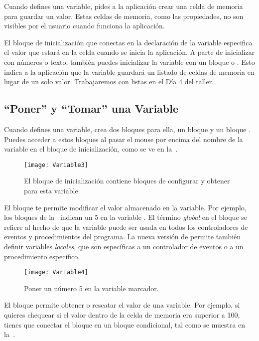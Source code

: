 Cuando defines una variable, pides a la aplicación crear una celda de
memoria para guardar un valor. Estas celdas de memoria, como las
propiedades, no son visibles por el usuario cuando funciona la
aplicación.

El bloque de inicialización que conectas en la declaración de la
variable especifica el valor que estará en la celda cuando se inicia
la aplicación. A parte de inicializar con números o texto, también
puedes inicializar la variable con un bloque  o . Esto indica a la aplicación
que la variable guardará un listado de celdas de memoria en lugar de
un solo valor. Trabajaremos con listas en el Día 4 del taller.

\subsection*{``Poner'' y ``Tomar'' una Variable}

Cuando defines una variable, \AppInventor crea dos bloques para ella,
un bloque  y un bloque . Puedes acceder a
estos bloques al pasar el mouse por encima del nombre de la variable
en el bloque de inicialización, como se ve en la~.

\begin{figure}[H]
\centering
\texttt{[image: Variable3]}
\caption{El bloque de inicialización contiene bloques de configurar y
  obtener para esta variable.}
\label{fig:Variable3}
\end{figure}

El bloque  te permite modificar el valor
almacenado en la variable. Por ejemplo, los bloques de
la~ indican un 5 en la variable
. El término \emph{global} en el bloque se refiere
al hecho de que la variable puede ser usada en todos los controladores
de eventos y procedimientos del programa. La nueva versión de
\AppInventor permite también definir variables \emph{locales}, que son
específicas a un controlador de eventos o a un procedimiento
específico.

\begin{figure}[H]
\centering
\texttt{[image: Variable4]}
\caption{Poner un número 5 en la variable marcador.}
\label{fig:Variable4}
\end{figure}

El bloque  permite obtener o rescatar el valor
de una variable. Por ejemplo, si quieres chequear si el valor dentro de
la celda de memoria era superior a 100, tienes que conectar el bloque
 en un bloque condicional, tal como se
muestra en la~.

